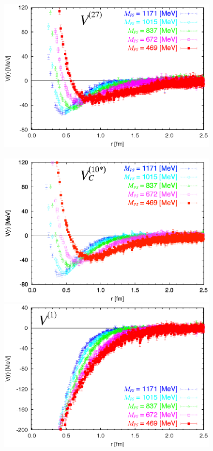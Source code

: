 \begin{figure}[t]
\begin{center}
\includegraphics[scale=0.55]{Chapter3-figures/Vc_27_npa2.eps}\ \ \ \ \ \ \ 
\includegraphics[scale=0.55]{Chapter3-figures/Vc_10s_npa2.eps}\\
\includegraphics[scale=0.55]{Chapter3-figures/Vc_1_npa2.eps}\ \ \ \ \ \ \ 

\end{center}
\end{figure}
